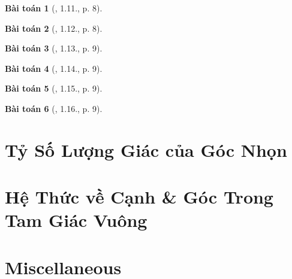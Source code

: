 \documentclass{article}
\newtheorem{baitoan}{Bài toán}
\begin{document}
\begin{baitoan}[\cite{TLCT_THCS_Toan_9_hinh_hoc}, 1.11., p. 8]
	
\end{baitoan}

\begin{baitoan}[\cite{TLCT_THCS_Toan_9_hinh_hoc}, 1.12., p. 8]
	
\end{baitoan}

\begin{baitoan}[\cite{TLCT_THCS_Toan_9_hinh_hoc}, 1.13., p. 9]
	
\end{baitoan}

\begin{baitoan}[\cite{TLCT_THCS_Toan_9_hinh_hoc}, 1.14., p. 9]
	
\end{baitoan}

\begin{baitoan}[\cite{TLCT_THCS_Toan_9_hinh_hoc}, 1.15., p. 9]
	
\end{baitoan}

\begin{baitoan}[\cite{TLCT_THCS_Toan_9_hinh_hoc}, 1.16., p. 9]
	
\end{baitoan}


\section{Tỷ Số Lượng Giác của Góc Nhọn}


\section{Hệ Thức về Cạnh \& Góc Trong Tam Giác Vuông}


\section{Miscellaneous}


\printbibliography[heading=bibintoc]
	
	
\end{document}
